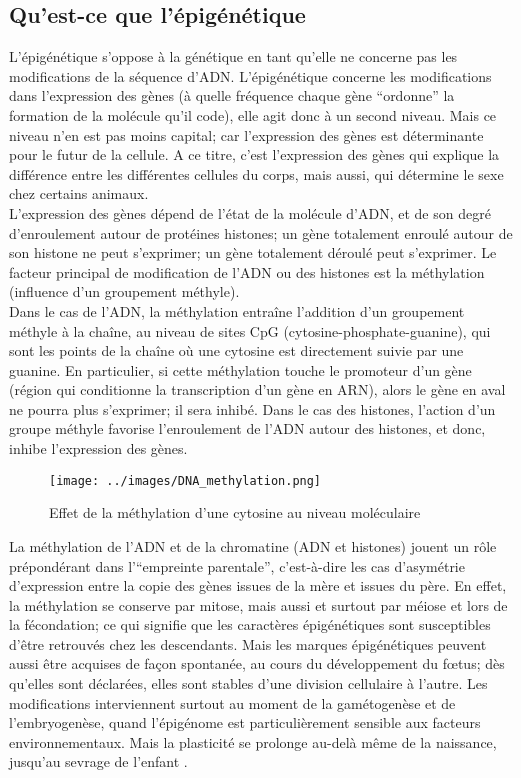 \documentclass[french]{article}
\begin{document}
			\subsection{Qu'est-ce que l'épigénétique}
				L'épigénétique s'oppose à la génétique en tant qu'elle ne concerne pas les modifications de la séquence d'ADN. L'épigénétique concerne les modifications dans l'expression des gènes (à quelle fréquence chaque gène ``ordonne'' la formation de la molécule qu'il code), elle agit donc à un second niveau. Mais ce niveau n'en est pas moins capital; car l'expression des gènes est déterminante pour le futur de la cellule. A ce titre, c'est l'expression des gènes qui explique la différence entre les différentes cellules du corps, mais aussi, qui détermine le sexe chez certains animaux.\\
				L'expression des gènes dépend de l'état de la molécule d'ADN, et de son degré d'enroulement autour de protéines histones; un gène totalement enroulé autour de son histone ne peut s'exprimer; un gène totalement déroulé peut s'exprimer. Le facteur principal de modification de l'ADN ou des histones est la méthylation (influence d'un groupement méthyle).\\
				Dans le cas de l'ADN, la méthylation entraîne l'addition d'un groupement méthyle à la chaîne, au niveau de sites CpG (cytosine-phosphate-guanine), qui sont les points de la chaîne où une cytosine est directement suivie par une guanine. En particulier, si cette méthylation touche le promoteur d'un gène (région qui conditionne la transcription d'un gène en ARN), alors le gène en aval ne pourra plus s'exprimer; il sera inhibé. Dans le cas des histones, l'action d'un groupe méthyle favorise l'enroulement de l'ADN autour des histones, et donc, inhibe l'expression des gènes.\\
				\begin{figure}[H]
					\centering
					\texttt{[image: ../images/DNA\_methylation.png]}
					\caption{Effet de la méthylation d'une cytosine au niveau moléculaire}
				\end{figure}
				La méthylation de l'ADN et de la chromatine (ADN et histones) jouent un rôle prépondérant dans l'``empreinte parentale'', c'est-à-dire les cas d'asymétrie d'expression entre la copie des gènes issues de la mère et issues du père. En effet, la méthylation se conserve par mitose, mais aussi et surtout par méiose et lors de la fécondation; ce qui signifie que les caractères épigénétiques sont susceptibles d'être retrouvés chez les descendants. Mais les marques épigénétiques peuvent aussi être acquises de façon spontanée, au cours du développement du fœtus; dès qu'elles sont déclarées, elles sont stables d'une division cellulaire à l'autre. Les modifications interviennent surtout au moment de la gamétogenèse et de l'embryogenèse, quand l'épigénome est particulièrement sensible aux facteurs environnementaux. Mais la plasticité se prolonge au-delà même de la naissance, jusqu'au sevrage de l'enfant \cite{vaiserman2017}.
			
\end{document}
